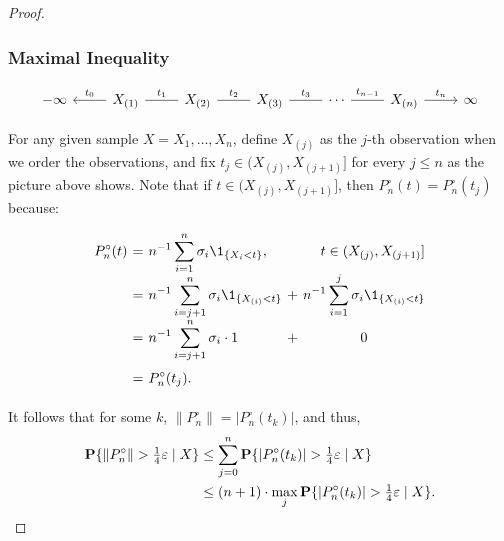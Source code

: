 \begin{proof}
  \vspace*{1em}

  \subsubsection*{Maximal Inequality}

  \[\begin{tikzcd}
    {-\infty} & {X_{(1)}} & {X_{(2)}} & {X_{(3)}} & \cdots & {X_{(n)}} & \infty
    \arrow["{t_1}", no head, from=1-2, to=1-3]%
    \arrow["{t_2}", no head, from=1-3, to=1-4]%
    \arrow["{t_3}", no head, from=1-4, to=1-5]%
    \arrow["{t_{n-1}}", no head, from=1-5, to=1-6]%
    \arrow["{t_0}"', from=1-2, to=1-1]%
    \arrow["{t_n}", from=1-6, to=1-7]%
  \end{tikzcd}\]

  For any given sample $X = X_1, \ldots, X_n$, define $X_{(j)}$ as the $j$-th observation when we order the observations, and fix $t_j \in (X_{(j)}, X_{(j+1)}]$ for every $j\leq n$ as the picture above shows. Note that if $t \in (X_{(j)}, X_{(j+1)}]$, then $P_n^\circ (t) = P_n^\circ (t_j)$ because:  %

  \[ \everymath{\displaystyle}\arraycolsep=1.8pt\def\arraystretch{1.8}
  \begin{array}{rclcl}
    P_n^\circ (t) & = & n^{-1}\sum_{i = 1}^n \sigma_i\1_{\{ X_i < t\}}, & & \hfill t \in (X_{(j)}, X_{(j+1)}] \\ %
    & = & n^{-1}\sum_{i = j+1}^{n} \sigma_i\1_{\{ X_{(i)} < t\}} & + & n^{-1} \sum_{i = 1}^{j} \sigma_i \1_{\{ X_{(i)} < t\}}\\
    & = & n^{-1}\sum_{i = j+1}^{n} \sigma_i \cdot 1 & + &  \hfill0\hfill\\
    & = & P_n^\circ (t_j).
  \end{array}
  \]

  It follows that for some $k$, $\|P_n^\circ\| = |P_n^\circ (t_k)|$, and thus,
   \begin{equation} \label{gc:3}
    \everymath{\displaystyle}\arraycolsep=1.4pt\def\arraystretch{1.5}
    \begin{array}{rcl}
      \P\{ \|P_n^\circ\| > \tfrac{1}{4} \varepsilon \;|\; X \} & \leq & \sum_{j = 0}^n\P\{ |P_n^\circ(t_k)| > \tfrac{1}{4} \varepsilon \;|\; X \}\\
      & \leq & (n+1) \cdot \max_j \P\{ |P_n^\circ(t_k)| > \tfrac{1}{4} \varepsilon \;|\; X \} .
    \end{array} 
  \end{equation}
  \vspace*{1em}


\end{proof}
